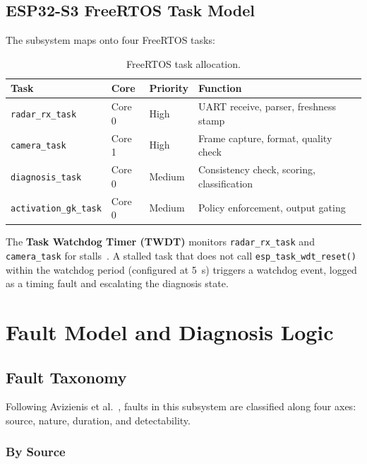 \documentclass[12pt]{extarticle}
\begin{document}
\subsection{ESP32-S3 FreeRTOS Task Model}

The subsystem maps onto four FreeRTOS tasks:

\begin{table}[H]
\centering
\caption{FreeRTOS task allocation.}
\label{tab:tasks}
\small
\begin{tabular}{llll}
\toprule
\textbf{Task} & \textbf{Core} & \textbf{Priority} & \textbf{Function}\\
\midrule
\texttt{radar\_rx\_task}     & Core 0 & High   & UART receive, parser, freshness stamp\\
\texttt{camera\_task}        & Core 1 & High   & Frame capture, format, quality check\\
\texttt{diagnosis\_task}     & Core 0 & Medium & Consistency check, scoring, classification\\
\texttt{activation\_gk\_task}& Core 0 & Medium & Policy enforcement, output gating\\
\bottomrule
\end{tabular}
\end{table}

The \textbf{Task Watchdog Timer (TWDT)} monitors \texttt{radar\_rx\_task} and
\texttt{camera\_task} for stalls~\cite{espressif_watchdog}.
A stalled task that does not call \texttt{esp\_task\_wdt\_reset()} within the watchdog
period (configured at 5~s) triggers a watchdog event, logged as a timing fault and
escalating the diagnosis state.

\section{Fault Model and Diagnosis Logic}
\label{sec:faultmodel}

\subsection{Fault Taxonomy}

Following Avizienis et al.~\cite{avizienis2004}, faults in this subsystem are
classified along four axes: source, nature, duration, and detectability.

\subsubsection{By Source}
\end{document}
